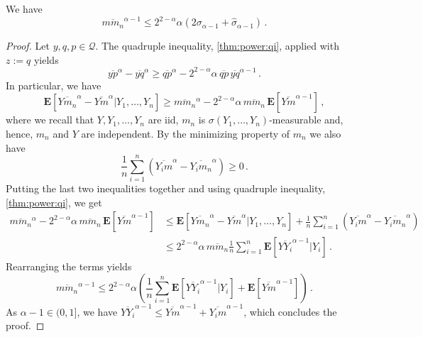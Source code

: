 \documentclass{article}
\newcommand*{\mc}[1]{\mathcal{#1}}
\newcommand{\lab}{\left[} %
\newcommand{\rab}{\right]} %
\newcommand{\ab}[1]{\lab #1 \rab} %
\newcommand{\abOf}[1]{\!\ab{#1}} %
\newcommand{\lb}{\left(} %
\newcommand{\rb}{\right)} %
\newcommand{\br}[1]{\lb #1 \rb} %
\newcommand{\E}{\mathbf{E}} %
\newcommand{\EOf}[1]{\E\abOf{#1}}
\newcommand{\eqcm}{\,,} %
\newcommand{\eqfs}{\,.}
\newcommand{\ol}[2]{\overline{#1#2}}
\begin{document}
%
\begin{lemma}\label{lmm:power:rough}
    We have
    \begin{equation}
        \ol m{m_n}^{\alpha -1}
        \leq
        2^{2-\alpha} \alpha \br{
            2 \sigma_{\alpha-1} + \hat \sigma_{\alpha-1}
        }
        \eqfs
    \end{equation}
\end{lemma}
%
\begin{proof}
    Let $y,q,p\in\mc Q$. The quadruple inequality, \cref{thm:power:qi}, applied with $z:=q$ yields
    \begin{equation}
        \ol yp^\alpha - \ol yq^\alpha
        \geq 
        \ol qp^\alpha - 2^{2-\alpha} \alpha \,\ol qp\, \ol yq^{\alpha-1}
        \eqfs
    \end{equation}
    In particular, we have
    \begin{equation}
        \EOf{\ol Y{m_n}^\alpha - \ol Ym^\alpha | Y_1, \dots, Y_n} \geq 
        \ol m{m_n}^\alpha - 2^{2-\alpha} \alpha \,\ol m{m_n}\, \EOf{\ol Ym^{\alpha-1}}
        \eqcm
    \end{equation}
    where we recall that $Y, Y_1, \dots, Y_n$ are iid, $m_n$ is $\sigma(Y_1, \dots, Y_n)$-measurable and, hence, $m_n$ and $Y$ are independent.
    By the minimizing property of $m_n$ we also have
    \begin{equation}
        \frac1n\sum_{i=1}^n\br{\ol {Y_i}{m}^\alpha - \ol {Y_i}{m_n}^\alpha} \geq 0
        \eqfs
    \end{equation}
    Putting the last two inequalities together and using quadruple inequality, \cref{thm:power:qi}, we get
    \begin{align}
        \ol m{m_n}^\alpha - 2^{2-\alpha} \alpha \,\ol m{m_n}\, \EOf{\ol Ym^{\alpha-1}}
        &\leq 
        \EOf{\ol Y{m_n}^\alpha - \ol Ym^\alpha | Y_1, \dots, Y_n} + 
        \frac1n\sum_{i=1}^n\br{\ol {Y_i}{m}^\alpha - \ol {Y_i}{m_n}^\alpha}
        \\&\leq
        2^{2-\alpha} \alpha \, \ol m{m_n} \frac1n \sum_{i=1}^n \EOf{\ol Y{Y_i}^{\alpha-1} | Y_i}
        \eqfs
    \end{align}
    Rearranging the terms yields
    \begin{equation}
        \ol m{m_n}^{\alpha -1}
        \leq
        2^{2-\alpha} \alpha \br{
            \frac1n \sum_{i=1}^n \EOf{\ol Y{Y_i}^{\alpha-1} | Y_i}
            +
            \EOf{\ol Ym^{\alpha-1}}
        }
        \eqfs
    \end{equation}
    As $\alpha-1\in(0,1]$, we have $\ol Y{Y_i}^{\alpha-1} \leq \ol Y{m}^{\alpha-1} + \ol {Y_i}m^{\alpha-1}$, which concludes the proof.
\end{proof}
\end{document}
